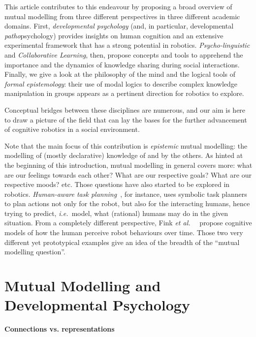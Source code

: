 \documentclass{sig-alternate}
\newcommand{\etal}{{\textit{et al.~}}}
\newcommand{\ie}{{\textit{i.e.~}}}
\begin{document}
This article contributes to this endeavour by proposing a broad overview of
mutual modelling from three different perspectives in three different academic
domains. First, \emph{developmental psychology} (and, in particular, developmental
\emph{patho}psychology) provides insights on human cognition and an
extensive experimental framework that has a strong potential in robotics.
\emph{Psycho-linguistic} and \emph{Collaborative Learning}, then, propose
concepts and tools to apprehend the importance and the dynamics of knowledge
sharing during social interactions. Finally, we give a look at the philosophy of
the mind and the logical tools of \emph{formal epistemology}: their use of modal
logics to describe complex knowledge manipulation in groups appears as a
pertinent direction for robotics to explore.

Conceptual bridges between these disciplines are numerous, and our aim is here to
draw a picture of the field that can lay the bases for the further advancement of
cognitive robotics in a social environment.

Note that the main focus of this contribution is \emph{epistemic} mutual
modelling: the modelling of (mostly declarative) knowledge of and by the others.
As hinted at the beginning of this introduction, mutual modelling in general covers
more: what are our feelings towards each other? What are our respective goals?
What are our respective moods? etc. Those questions have also
started to be explored in robotics. \emph{Human-aware task
planning}~\cite{alami2006toward, cirillo2010human}, for instance, uses symbolic
task planners to plan actions not only for the robot, but also for the
interacting humans, hence trying to predict, \ie model, what (rational) humans
may do in the given situation. From a completely different perspective, Fink
\etal~\cite{fink2014dynamics} propose cognitive models of how the human perceive
robot behaviours over time. Those two very different yet prototypical examples
give an idea of the breadth of the ``mutual modelling question''.

\section{Mutual Modelling and Developmental Psychology}

\paragraph{Connections vs. representations}
\end{document}
